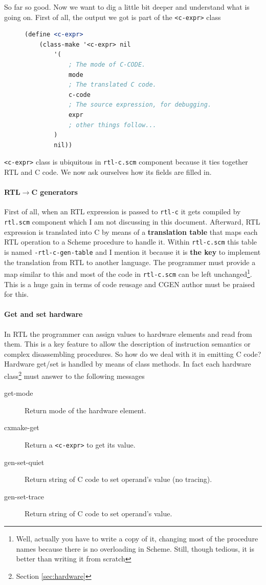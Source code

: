 \documentclass{article}
\begin{document}
So far so good. Now we want to dig a little bit deeper and understand what is going on. First of all, the output we got is part of the \texttt{<c-expr>} class

\begin{figure}[H]
\begin{lstlisting}[language=Scheme, caption=Part of <c-expr> class declaration]
(define <c-expr>
	(class-make '<c-expr> nil
		'(
			; The mode of C-CODE.
			mode
			; The translated C code.
			c-code
			; The source expression, for debugging.
			expr
			; other things follow...
		)
		nil))
\end{lstlisting}
\end{figure}

\texttt{<c-expr>} class is ubiquitous in \texttt{rtl-c.scm} component because it ties together RTL and C code. We now ask ourselves how its fields are filled in.

\paragraph{RTL$\rightarrow$C generators}
First of all, when an RTL expression is passed to \texttt{rtl-c} it gets compiled by \texttt{rtl.scm} component which I am not discussing in this document. Afterward, RTL expression is translated into C by means of a \textbf{translation table} that maps each RTL operation to a Scheme procedure to handle it. Within \texttt{rtl-c.scm} this table is named \texttt{-rtl-c-gen-table} and I mention it because it is \textbf{the key} to implement the translation from RTL to another language. The programmer must provide a map similar to this and most of the code in \texttt{rtl-c.scm} can be left unchanged\footnote{Well, actually you have to write a copy of it, changing most of the procedure names because there is no overloading in Scheme. Still, though tedious, it is better than writing it from scratch}. This is a huge gain in terms of code reusage and CGEN author must be praised for this.

\paragraph{Get and set hardware}
In RTL the programmer can assign values to hardware elements and read from them. This is a key feature to allow the description of instruction semantics or complex disassembling procedures. So how do we deal with it in emitting C code? Hardware get/set is handled by means of class methods. In fact each hardware class\footnote{Section \ref{sec:hardware}} must answer to the following messages
\begin{description}
\item[get-mode] Return mode of the hardware element.
\item[cxmake-get] Return a \texttt{<c-expr>} to get its value.
\item[gen-set-quiet] Return string of C code to set operand's value (no tracing).
\item[gen-set-trace] Return string of C code to set operand's value.
\end{description}
\end{document}
